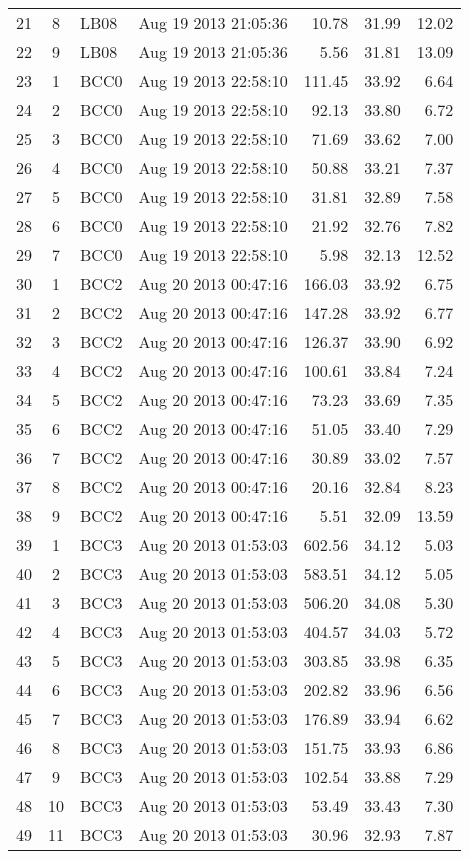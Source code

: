 \documentclass{article}
\begin{document}
\begin{longtable}{ccllrrr}
21&8&LB08&Aug 19 2013 21:05:36&10.78&31.99&12.02\\
22&9&LB08&Aug 19 2013 21:05:36&5.56&31.81&13.09\\
\hline 
23&1&BCC0&Aug 19 2013 22:58:10&111.45&33.92&6.64\\
24&2&BCC0&Aug 19 2013 22:58:10&92.13&33.80&6.72\\
25&3&BCC0&Aug 19 2013 22:58:10&71.69&33.62&7.00\\
26&4&BCC0&Aug 19 2013 22:58:10&50.88&33.21&7.37\\
27&5&BCC0&Aug 19 2013 22:58:10&31.81&32.89&7.58\\
28&6&BCC0&Aug 19 2013 22:58:10&21.92&32.76&7.82\\
29&7&BCC0&Aug 19 2013 22:58:10&5.98&32.13&12.52\\
\hline 
30&1&BCC2&Aug 20 2013 00:47:16&166.03&33.92&6.75\\
31&2&BCC2&Aug 20 2013 00:47:16&147.28&33.92&6.77\\
32&3&BCC2&Aug 20 2013 00:47:16&126.37&33.90&6.92\\
33&4&BCC2&Aug 20 2013 00:47:16&100.61&33.84&7.24\\
34&5&BCC2&Aug 20 2013 00:47:16&73.23&33.69&7.35\\
35&6&BCC2&Aug 20 2013 00:47:16&51.05&33.40&7.29\\
36&7&BCC2&Aug 20 2013 00:47:16&30.89&33.02&7.57\\
37&8&BCC2&Aug 20 2013 00:47:16&20.16&32.84&8.23\\
38&9&BCC2&Aug 20 2013 00:47:16&5.51&32.09&13.59\\
\hline 
39&1&BCC3&Aug 20 2013 01:53:03&602.56&34.12&5.03\\
40&2&BCC3&Aug 20 2013 01:53:03&583.51&34.12&5.05\\
41&3&BCC3&Aug 20 2013 01:53:03&506.20&34.08&5.30\\
42&4&BCC3&Aug 20 2013 01:53:03&404.57&34.03&5.72\\
43&5&BCC3&Aug 20 2013 01:53:03&303.85&33.98&6.35\\
44&6&BCC3&Aug 20 2013 01:53:03&202.82&33.96&6.56\\
45&7&BCC3&Aug 20 2013 01:53:03&176.89&33.94&6.62\\
46&8&BCC3&Aug 20 2013 01:53:03&151.75&33.93&6.86\\
47&9&BCC3&Aug 20 2013 01:53:03&102.54&33.88&7.29\\
48&10&BCC3&Aug 20 2013 01:53:03&53.49&33.43&7.30\\
49&11&BCC3&Aug 20 2013 01:53:03&30.96&32.93&7.87\\

\end{longtable}
\end{document}
